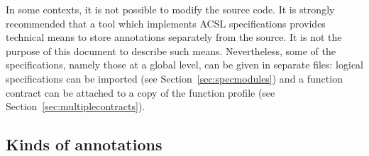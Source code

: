 In some contexts, it is not possible to modify the source code.
It is strongly recommended that a tool which implements
ACSL specifications provides technical means to store annotations
separately from the source. It is not the purpose of this document
to describe such means.  Nevertheless, some of the specifications,
namely those at a global level, can be given in separate files:
logical specifications can be imported (see
Section~\ref{sec:specmodules}) and a function contract can be attached
to a copy of the function profile (see
Section~\ref{sec:multiplecontracts}).




\subsection{Kinds of annotations}

